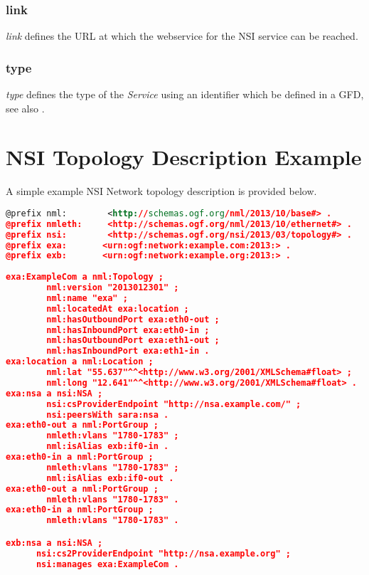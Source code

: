 \documentclass[12pt]{article}  %
\begin{document}

\subsubsection{link} %
\label{ssub:link}

\emph{link} defines the URL at which the webservice for the NSI service can be reached.


\subsubsection{type} %
\label{ssub:type}

\emph{type} defines the type of the \emph{Service} using an identifier which \SHOULD{} be defined in a GFD, see also \cite{gfd-discovery-service}.



\section{NSI Topology Description Example}

 A simple example NSI Network topology description is provided 
below. 

\begin{lstlisting}[language=XML]
@prefix nml:        <http://schemas.ogf.org/nml/2013/10/base#> .
@prefix nmleth:     <http://schemas.ogf.org/nml/2013/10/ethernet#> .
@prefix nsi:        <http://schemas.ogf.org/nsi/2013/03/topology#> .
@prefix exa:       <urn:ogf:network:example.com:2013:> .
@prefix exb:       <urn:ogf:network:example.org:2013:> .
  
exa:ExampleCom a nml:Topology ;
        nml:version "2013012301" ;
        nml:name "exa" ;
        nml:locatedAt exa:location ;
        nml:hasOutboundPort exa:eth0-out ;
        nml:hasInboundPort exa:eth0-in ;
        nml:hasOutboundPort exa:eth1-out ;
        nml:hasInboundPort exa:eth1-in .
exa:location a nml:Location ;
        nml:lat "55.637"^^<http://www.w3.org/2001/XMLSchema#float> ;
        nml:long "12.641"^^<http://www.w3.org/2001/XMLSchema#float> .
exa:nsa a nsi:NSA ;
        nsi:csProviderEndpoint "http://nsa.example.com/" ;
        nsi:peersWith sara:nsa .
exa:eth0-out a nml:PortGroup ;
        nmleth:vlans "1780-1783" ;
        nml:isAlias exb:if0-in .
exa:eth0-in a nml:PortGroup ;
        nmleth:vlans "1780-1783" ;
        nml:isAlias exb:if0-out .
exa:eth0-out a nml:PortGroup ;
        nmleth:vlans "1780-1783" .
exa:eth0-in a nml:PortGroup ;
        nmleth:vlans "1780-1783" .

exb:nsa a nsi:NSA ;
      nsi:cs2ProviderEndpoint "http://nsa.example.org" ;
      nsi:manages exa:ExampleCom .
      
\end{lstlisting}
\end{document}
